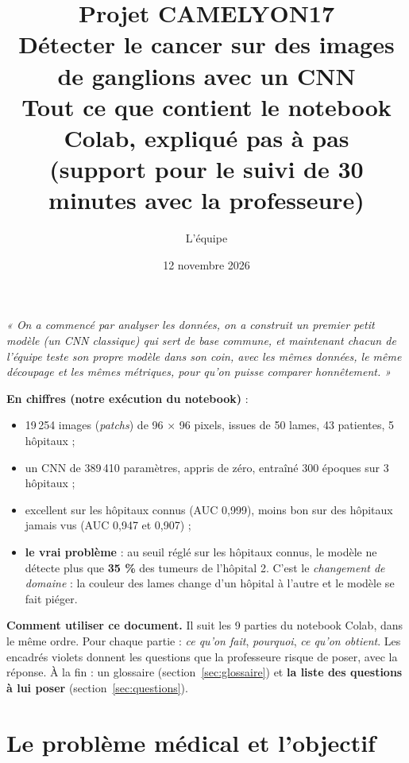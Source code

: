 \documentclass[11pt,a4paper]{article}
\title{\vspace{-1.2cm}\textbf{\color{bleu}Projet CAMELYON17}\\[4pt]
\large Détecter le cancer sur des images de ganglions avec un CNN\\[2pt]
\normalsize Tout ce que contient le notebook Colab, expliqué pas à pas\\
\normalsize (support pour le suivi de 30 minutes avec la professeure)}
\author{L'équipe}
\date{12 novembre 2026}
\begin{document}
\maketitle
\thispagestyle{fancy}

\begin{resume}
\textit{« On a commencé par analyser les données, on a construit un premier petit modèle (un CNN classique)
qui sert de base commune, et maintenant chacun de l'équipe teste son propre modèle dans son coin, avec les
mêmes données, le même découpage et les mêmes métriques, pour qu'on puisse comparer honnêtement. »}

\medskip
\textbf{En chiffres (notre exécution du notebook)} :
\begin{itemize}
  \item 19\,254 images (\emph{patchs}) de 96 × 96 pixels, issues de 50 lames, 43 patientes, 5 hôpitaux ;
  \item un CNN de 389\,410 paramètres, appris de zéro, entraîné 300 époques sur 3 hôpitaux ;
  \item excellent sur les hôpitaux connus (AUC 0,999), moins bon sur des hôpitaux jamais vus
        (AUC 0,947 et 0,907) ;
  \item \textbf{le vrai problème} : au seuil réglé sur les hôpitaux connus, le modèle ne détecte plus que
        \textbf{35 \%} des tumeurs de l'hôpital 2. C'est le \emph{changement de domaine} : la couleur des
        lames change d'un hôpital à l'autre et le modèle se fait piéger.
\end{itemize}
\end{resume}

\noindent\textbf{Comment utiliser ce document.} Il suit les 9 parties du notebook Colab, dans le même ordre.
Pour chaque partie : \emph{ce qu'on fait}, \emph{pourquoi}, \emph{ce qu'on obtient}. Les encadrés
\colorbox{violetclair}{violets} donnent les questions que la professeure risque de poser, avec la réponse.
À la fin : un glossaire (section~\ref{sec:glossaire}) et \textbf{la liste des questions à lui poser}
(section~\ref{sec:questions}).

\tableofcontents
\newpage

\section{Le problème médical et l'objectif}
\end{document}
